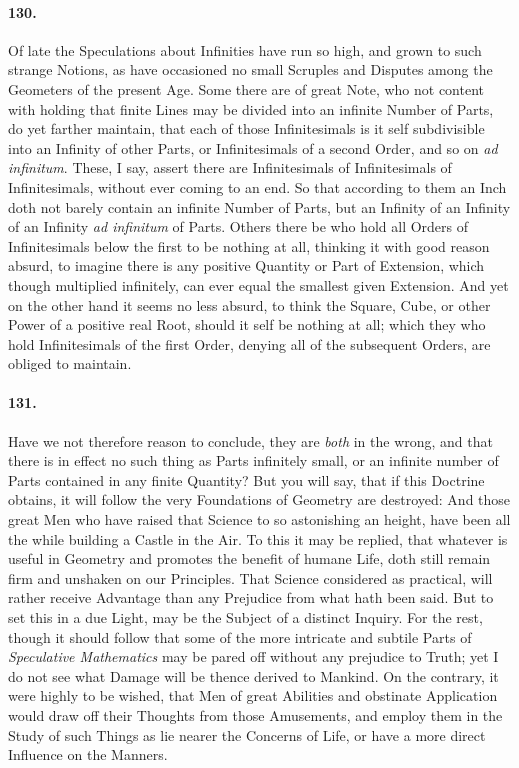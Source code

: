 \documentclass[]{article}
\newenvironment{sectionbody}{}{}
\begin{document}
\begin{sectionbody}
\paragraph{130.} Of late the Speculations about Infinities have run so high, and
grown to such strange Notions, as have occasioned no small
Scruples and Disputes among the Geometers of the present Age.
Some there are of great Note, who not content with holding that
finite Lines may be divided into an infinite Number of Parts, do
yet farther maintain, that each of those Infinitesimals is it
self subdivisible into an Infinity of other Parts, or
Infinitesimals of a second Order, and so on \emph{ad
infinitum}.  These, I say, assert there are Infinitesimals of
Infinitesimals of Infinitesimals, without ever coming to an end.
So that according to them an Inch doth not barely contain an
infinite Number of Parts, but an Infinity of an Infinity of an
Infinity \emph{ad infinitum} of Parts.  Others there be who
hold all Orders of Infinitesimals below the first to be nothing
at all, thinking it with good reason absurd, to imagine there is
any positive Quantity or Part of Extension, which though
multiplied infinitely, can ever equal the smallest given
Extension.  And yet on the other hand it seems no less absurd, to
think the Square, Cube, or other Power of a positive real Root,
should it self be nothing at all; which they who hold
Infinitesimals of the first Order, denying all of the subsequent
Orders, are obliged to maintain.



\paragraph{131.} Have we not therefore reason to conclude, they are \emph{both}
in the wrong, and that there is in effect no such thing as Parts
infinitely small, or an infinite number of Parts contained in any
finite Quantity?  But you will say, that if this Doctrine
obtains, it will follow the very Foundations of Geometry are
destroyed: And those great Men who have raised that Science to so
astonishing an height, have been all the while building a Castle
in the Air.  To this it may be replied, that whatever is useful
in Geometry and promotes the benefit of humane Life, doth still
remain firm and unshaken on our Principles.  That Science
considered as practical, will rather receive Advantage than any
Prejudice from what hath been said.  But to set this in a due
Light, may be the Subject of a distinct Inquiry.  For the rest,
though it should follow that some of the more intricate and
subtile Parts of \emph{Speculative Mathematics} may be pared
off without any prejudice to Truth; yet I do not see what Damage
will be thence derived to Mankind.  On the contrary, it were
highly to be wished, that Men of great Abilities and obstinate
Application would draw off their Thoughts from those Amusements,
and employ them in the Study of such Things as lie nearer the
Concerns of Life, or have a more direct Influence on the Manners.




\end{sectionbody}
\end{document}

